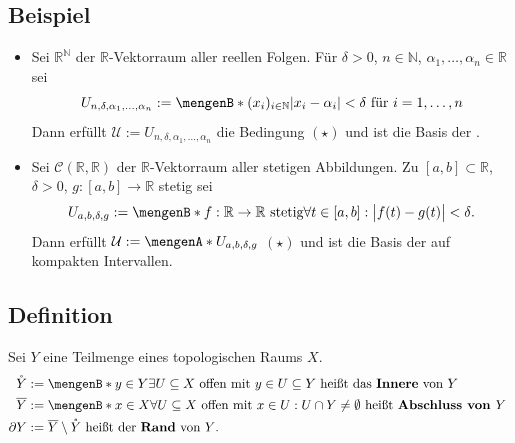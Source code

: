 \subsection[Beispiel: Topologie der punktweisen bzw. gleichmäßigen Konvergenz]{Beispiel} %
\label{sub:118}
\begin{itemize}
	\item Sei $\mathds{R}^\mathds{N}$ der $\mathds{R}$-Vektorraum aller reellen Folgen. Für 
	$\delta >0$, $n \in \mathds{N} $, $\alpha_1, \ldots , \alpha_n \in \mathds{R}$ sei
	\[
		U_{n, \delta , \alpha_1, \ldots , \alpha_n} := \set[(x_i)_{i \in \mathds{N}}]{\abs*{x_i - \alpha_i} < \delta \text{ für } i=1, \ldots ,n } 
	\]
	Dann erfüllt $\mathcal{U} := { U_{n, \delta , \alpha_1, \ldots , \alpha_n}}$ die Bedingung $(\star)$ und ist die Basis der .
	\item Sei $\mathcal{C}(\mathds{R},\mathds{R}) $ der $\mathds{R}$-Vektorraum aller stetigen Abbildungen. Zu $[a,b] \subset \mathds{R}$, $\delta >0$, 
	$g : [a,b] \to \mathds{R}$ stetig sei
	\[
		U_{a,b, \delta , g} := \set[f : \mathds{R} \to \mathds{R} \text{ stetig}]{\forall t \in [a,b] : \abs[\big]{f(t)- g(t)}< \delta}. 
	\]
	Dann erfüllt $\mathcal{U} := \set{U_{a,b,\delta ,g}}  $ $(\star)$ und ist die Basis der  auf kompakten Intervallen.
\end{itemize}

\subsection[Definition: Inneres, Abschluss und Rand]{Definition} %
\label{sub:119}
Sei $Y$ eine Teilmenge eines topologischen Raums $X$.
\begin{align*}
	\mathring Y &:= \set[y \in Y]{ \exists U \subseteq X \text{ offen mit } y \in U \subseteq Y} \text{ heißt das \Index{Innere} von $Y$} \\ 
	\overline{Y} &:= \set[x \in X]{\forall U \subseteq X \text{ offen mit } x \in U : U \cap Y \not= \emptyset}    \text{ heißt \Index{Abschluss von $Y$} } \\
	\partial Y &:= \overline{Y} \setminus \mathring Y \text{ heißt der \Index{Rand} von $Y$. } 
\end{align*}

